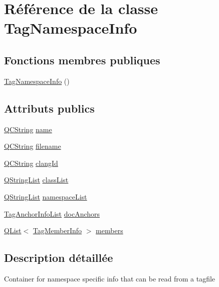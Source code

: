 \hypertarget{class_tag_namespace_info}{}\section{Référence de la classe Tag\+Namespace\+Info}
\label{class_tag_namespace_info}
\subsection*{Fonctions membres publiques}
\begin{DoxyCompactItemize}
\item 
\hyperlink{class_tag_namespace_info_ae24c1f21936e4e3b3cde0bb824396ef0}{Tag\+Namespace\+Info} ()
\end{DoxyCompactItemize}
\subsection*{Attributs publics}
\begin{DoxyCompactItemize}
\item 
\hyperlink{class_q_c_string}{Q\+C\+String} \hyperlink{class_tag_namespace_info_a3480b0fae0fddbecf92713cd425333a3}{name}
\item 
\hyperlink{class_q_c_string}{Q\+C\+String} \hyperlink{class_tag_namespace_info_ac8bd998116932e7629cecb3f6c88c911}{filename}
\item 
\hyperlink{class_q_c_string}{Q\+C\+String} \hyperlink{class_tag_namespace_info_aa1363b426320df0fb2d324d5d845ed96}{clang\+Id}
\item 
\hyperlink{class_q_string_list}{Q\+String\+List} \hyperlink{class_tag_namespace_info_aec8af55c4540ca70d96efb8d3eae2cab}{class\+List}
\item 
\hyperlink{class_q_string_list}{Q\+String\+List} \hyperlink{class_tag_namespace_info_a2543c5c9a6135a7ff8e4c9a3d8a66310}{namespace\+List}
\item 
\hyperlink{class_tag_anchor_info_list}{Tag\+Anchor\+Info\+List} \hyperlink{class_tag_namespace_info_ac7b68ca719335aeac5ffa0115a0674ab}{doc\+Anchors}
\item 
\hyperlink{class_q_list}{Q\+List}$<$ \hyperlink{class_tag_member_info}{Tag\+Member\+Info} $>$ \hyperlink{class_tag_namespace_info_a987fc81066062fc21a0a9535a941c0db}{members}
\end{DoxyCompactItemize}


\subsection{Description détaillée}
Container for namespace specific info that can be read from a tagfile 

